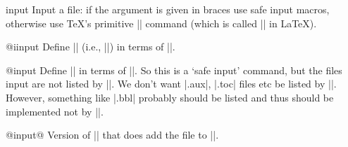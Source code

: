\begin{multicols}

    \begin{teX}
\long{}
    \end{teX}


  \begin{docCommand}{input}{}
    Input a file: if the argument is given in braces use safe input
    macros, otherwise use \TeX's primitive || command (which is
    called |\@@input| in \LaTeX).
  \end{docCommand}

    \begin{teX}
\def
    \end{teX}


 \begin{docCommand}{@iinput}{}
    Define |\@iinput| (i.e., ||) in terms of
    |\InputIfIfileExists|.
 \end{docCommand}
 
    \begin{teX}
\def\@iinput#1{%
  \InputIfFileExists{#1}{}%
  {\filename@parse{#1}%
   \edef\reserved@a{\noexpand\@missingfileerror
     {\filename@area\filename@base}%
     {\ifx\filename@ext\relax tex\else\filename@ext\fi}}%
   \reserved@a}}
    \end{teX}


 \begin{docCommand}{@input}{}
    Define |\@input| in terms of |\IffileExists|.
    So this is a `safe input' command, but the files input are not
    listed by |\listfiles|.
    We don't want |.aux|, |.toc| files etc be listed by |\listfiles|.
    However, something like |.bbl| probably should be listed and thus
    should be implemented not by |\@input|.
 \end{docCommand}
    \begin{teX}
\def\@input#1{%
  \IfFileExists{#1}{\@@input\@filef@und}{\typeout{No file #1.}}}
    \end{teX}


 \begin{docCommand}{@input@}{}
 Version of |\@input| that does add the file to |\@filelist|.
 \end{docCommand}
    \begin{teX}
\def\@input@#1{\InputIfFileExists{#1}{}{\typeout{No file #1.}}}
    \end{teX}



\end{multicols}
